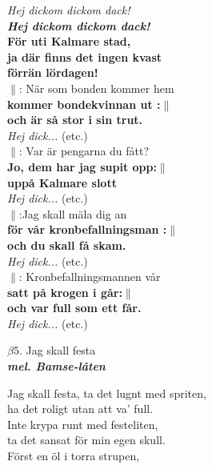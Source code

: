 \documentclass[a6paper,10pt]{article}
\newcommand{\mel}[1]{\small\textbf{\textit{mel. #1 \\}}}
\begin{document}
\textit{Hej dickom dickom dack!\\
\textbf{Hej dickom dickom dack!}}\vspace{5pt} \\
\textbf{För uti Kalmare stad,\\ ja där finns det ingen kvast\\ förrän lördagen!}
\vspace{5pt} \\
$\|$: När som bonden kommer hem \\
\textbf{kommer bondekvinnan ut :$\|$ \\och är så stor i sin trut.}
\vspace{5pt} \\
\textit{Hej dick...} (etc.) 
\vspace{5pt} \\
$\|$: Var är pengarna du fått?\\
\textbf{Jo, dem har jag supit opp:$\|$ \\uppå Kalmare slott}
\vspace{5pt} \\
\textit{Hej dick...} (etc.)
\vspace{5pt} \\
$\|$:Jag skall mäla dig an\\
\textbf{för vår kronbefallningsman :$\|$ \\ och du skall få skam.}
\setlength{\oddsidemargin}{-0.37in}
\noindent
\vspace{5pt} \\
\textit{Hej dick...} (etc.)
\vspace{5pt} \\
$\|$: Kronbefallningsmannen vår \\
\textbf{satt på krogen i går:$\|$\\ och var full som ett får.}
\vspace{5pt} \\
\textit{Hej dick...} (etc.)
\begin{center}
\Large $\beta5$. Jag skall festa \\ 
\mel{Bamse-låten}
\end{center}
Jag skall festa, ta det lugnt med spriten,\\
ha det roligt utan att va' full.\\
Inte krypa runt med festeliten,\\
ta det sansat för min egen skull.
\vspace{5pt} \\
Först en öl i torra strupen,\\
\end{document}
